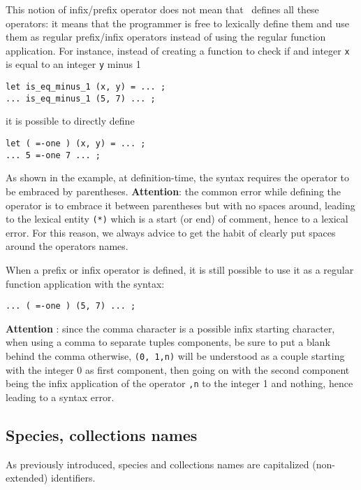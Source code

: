 \begin{itemize}
    This notion of infix/prefix operator does not mean that
    \focal\ defines all these operators: it means that the programmer
    is free to lexically define them and use them as regular
    prefix/infix operators instead of using the regular function
    application. For instance, instead of creating a function to check
    if and integer {\tt x} is equal to an integer {\tt y} minus 1
{\scriptsize
\begin{lstlisting}
let is_eq_minus_1 (x, y) = ... ;
... is_eq_minus_1 (5, 7) ... ;
\end{lstlisting}
}
    it is possible to directly define
{\scriptsize
\begin{lstlisting}
let ( =-one ) (x, y) = ... ;
... 5 =-one 7 ... ;
\end{lstlisting}
}
    As shown in the example, at definition-time, the syntax requires
    the operator to be embraced by parentheses. {\bf Attention}: the
    common error while defining the {\tt *} operator is to embrace it
    between parentheses but with no spaces around, leading to the
    lexical entity {\tt (*)} which is a start (or end) of comment,
    hence to a lexical error. For this reason, we always advice to
    get the habit of clearly put spaces around the operators names.

    When a prefix or infix operator is defined, it is still possible
    to use it as a regular function application with the syntax:
{\scriptsize
\begin{lstlisting}
... ( =-one ) (5, 7) ... ;
\end{lstlisting}
}

    {\bf Attention} : since the comma character is a possible infix
    starting character, when using a comma to separate tuples
    components, be sure to put a blank behind the comma otherwise,
    {\tt (0, 1,n)} will be understood as a couple starting with the
    integer 0 as first component, then going on with the second
    component being the infix application of the operator {\tt ,n} to
    the integer 1 and nothing, hence leading to a syntax error.

\end{itemize}



\subsection{Species, collections names}
As previously introduced, species and collections names are
capitalized (non-extended) identifiers.



